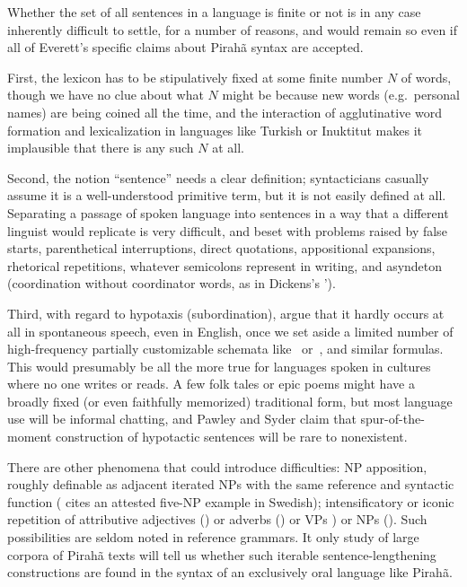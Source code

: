 \documentclass[output=paper,colorlinks,citecolor=brown
]{langscibook}
\begin{document}
Whether the set of all sentences in a language is finite or not is
in any case inherently difficult to settle, for a number of reasons,
and would remain so even if all of Everett's specific claims about
Pirah{\~a} syntax are accepted.

First, the lexicon has to be stipulatively fixed at some finite number
$N$ of words, though we have no clue about what $N$ might be because
new words (e.g.\ personal names) are being coined all the time, and
the interaction of agglutinative word formation and lexicalization
in languages like Turkish or Inuktitut makes it implausible that there
is any such $N$ at all.

Second, the notion ``sentence'' needs a clear definition; syntacticians
casually assume it is a well-understood primitive term, but it is not
easily defined at all. Separating a passage of spoken language into
sentences in a way that a different linguist would replicate is very
difficult, and beset with problems raised by false starts,
parenthetical interruptions, direct quotations, appositional
expansions, rhetorical repetitions, whatever semicolons represent in
writing, and asyndeton (coordination without coordinator words, as
in Dickens's ').

Third, with regard to hypotaxis (subordination), \citet{PawlSyde00}
argue that it hardly occurs at all in spontaneous speech, even in
English, once we set aside a limited number of high-frequency partially
customizable schemata like \, or \,, and similar formulas. This would presumably be all
the more true for languages spoken in cultures where no one writes
or reads. A few folk tales or epic poems might have a broadly fixed
(or even faithfully memorized) traditional form, but most language
use will be informal chatting, and Pawley and Syder claim that
spur-of-the-moment construction of hypotactic sentences will be rare
to nonexistent.

There are other phenomena that could introduce difficulties: NP
apposition, roughly definable as adjacent iterated NPs with the same
reference and syntactic function (\citealt{Karlsson10} cites an
attested five-NP example in Swedish); intensificatory or iconic
repetition of attributive adjectives ()
or adverbs () or VPs ) or NPs (). Such possibilities are seldom noted
in reference grammars. It only study of large corpora of Pirah{\~a}
texts will tell us whether such iterable sentence-lengthening
constructions are found in the syntax of an exclusively oral language
like Pirah{\~a}.
\end{document}
